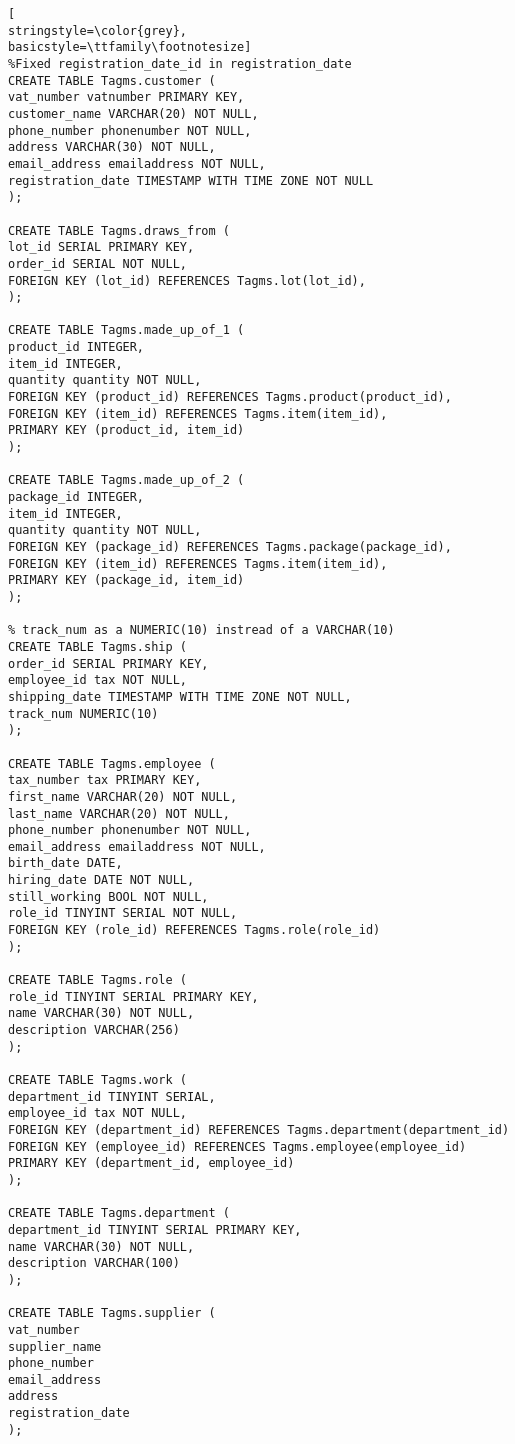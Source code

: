 \begin{lstlisting}[
stringstyle=\color{grey},
basicstyle=\ttfamily\footnotesize]
%Fixed registration_date_id in registration_date
CREATE TABLE Tagms.customer (
vat_number vatnumber PRIMARY KEY,
customer_name VARCHAR(20) NOT NULL,
phone_number phonenumber NOT NULL,
address VARCHAR(30) NOT NULL,
email_address emailaddress NOT NULL,
registration_date TIMESTAMP WITH TIME ZONE NOT NULL
);

CREATE TABLE Tagms.draws_from (
lot_id SERIAL PRIMARY KEY,
order_id SERIAL NOT NULL,
FOREIGN KEY (lot_id) REFERENCES Tagms.lot(lot_id),
);

CREATE TABLE Tagms.made_up_of_1 (
product_id INTEGER,
item_id INTEGER,
quantity quantity NOT NULL,
FOREIGN KEY (product_id) REFERENCES Tagms.product(product_id),
FOREIGN KEY (item_id) REFERENCES Tagms.item(item_id),
PRIMARY KEY (product_id, item_id)
);

CREATE TABLE Tagms.made_up_of_2 (
package_id INTEGER,
item_id INTEGER,
quantity quantity NOT NULL,
FOREIGN KEY (package_id) REFERENCES Tagms.package(package_id),
FOREIGN KEY (item_id) REFERENCES Tagms.item(item_id),
PRIMARY KEY (package_id, item_id)
);

% track_num as a NUMERIC(10) instread of a VARCHAR(10)
CREATE TABLE Tagms.ship (
order_id SERIAL PRIMARY KEY,
employee_id tax NOT NULL,
shipping_date TIMESTAMP WITH TIME ZONE NOT NULL,
track_num NUMERIC(10) 
);

CREATE TABLE Tagms.employee (
tax_number tax PRIMARY KEY,
first_name VARCHAR(20) NOT NULL,
last_name VARCHAR(20) NOT NULL,
phone_number phonenumber NOT NULL,
email_address emailaddress NOT NULL,
birth_date DATE,
hiring_date DATE NOT NULL,
still_working BOOL NOT NULL,
role_id TINYINT SERIAL NOT NULL,
FOREIGN KEY (role_id) REFERENCES Tagms.role(role_id)
);

CREATE TABLE Tagms.role (
role_id TINYINT SERIAL PRIMARY KEY,
name VARCHAR(30) NOT NULL,
description VARCHAR(256)
);

CREATE TABLE Tagms.work (
department_id TINYINT SERIAL,
employee_id tax NOT NULL,
FOREIGN KEY (department_id) REFERENCES Tagms.department(department_id)
FOREIGN KEY (employee_id) REFERENCES Tagms.employee(employee_id)
PRIMARY KEY (department_id, employee_id)
);

CREATE TABLE Tagms.department (
department_id TINYINT SERIAL PRIMARY KEY,
name VARCHAR(30) NOT NULL,
description VARCHAR(100)
);

CREATE TABLE Tagms.supplier (
vat_number
supplier_name
phone_number
email_address
address
registration_date
);

\end{lstlisting}
